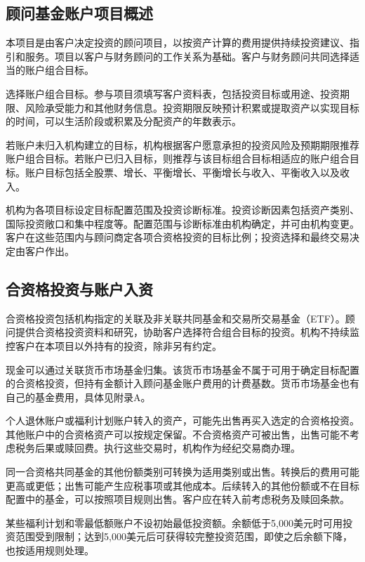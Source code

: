 \documentclass[UTF8,fontset=none,11pt,a4paper]{ctexart}
\begin{document}
\subsection*{顾问基金账户项目概述}
本项目是由客户决定投资的顾问项目，以按资产计算的费用提供持续投资建议、指引和服务。项目以客户与财务顾问的工作关系为基础。客户与财务顾问共同选择适当的账户\allowbreak\mbox{组合目标。}


选择账户组合目标。参与项目须填写客户资料表，包括投资目标或用途、投资期限、风险承受能力和其他财务信息。投资期限反映预计积累或提取资产以实现目标的时间，可以生活阶段或积累及分配资产的\allowbreak\mbox{年数表示。}


若账户未归入机构建立的目标，机构根据客户愿意承担的投资风险及预期期限推荐账户组合目标。若账户已归入目标，则推荐与该目标组合目标相适应的账户组合目标。账户目标包括全股票、增长、平衡增长、平衡增长与收入、平衡收入\allowbreak\mbox{以及收入。}


机构为各项目标设定目标配置范围及投资诊断标准。投资诊断因素包括资产类别、国际投资敞口和集中程度等。配置范围与诊断标准由机构确定，并可由机构变更。客户在这些范围内与顾问商定各项合资格投资的目标比例；投资选择和最终交易决定由\allowbreak\mbox{客户作出。}


\subsection*{合资格投资与账户入资}
合资格投资包括机构指定的关联及非关联共同基金和交易所交易基金（ETF）。顾问提供合资格投资资料和研究，协助客户选择符合组合目标的投资。机构不持续监控客户在本项目以外持有的投资，除非另\allowbreak\mbox{有约定。}


现金可以通过关联货币市场基金归集。该货币市场基金不属于可用于确定目标配置的合资格投资，但持有金额计入顾问基金账户费用的计费基数。货币市场基金也有自己的基金费用，具体见附录A。


个人退休账户或福利计划账户转入的资产，可能先出售再买入选定的合资格投资。其他账户中的合资格资产可以按规定保留。不合资格资产可被出售，出售可能不考虑税务后果或赎回费。执行这些交易时，机构作为经纪交\allowbreak\mbox{易商办理。}


同一合资格共同基金的其他份额类别可转换为适用类别或出售。转换后的费用可能更高或更低；出售可能产生应税事项或其他成本。后续转入的其他份额或不在目标配置中的基金，可以按照项目规则出售。客户应在转入前考虑税务及\allowbreak\mbox{赎回条款。}


某些福利计划和零最低额账户不设初始最低投资额。余额低于5,000美元时可用投资范围受到限制；达到5,000美元后可获得较完整投资范围，即使之后余额下降，也按适用\allowbreak\mbox{规则处理。}
\end{document}
